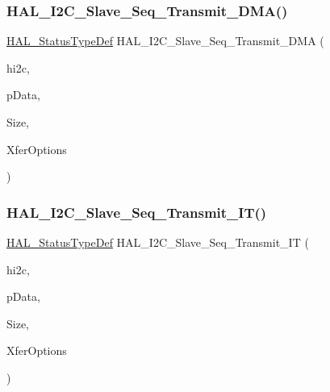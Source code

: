 \subsubsection{\texorpdfstring{H\+A\+L\+\_\+\+I2\+C\+\_\+\+Slave\+\_\+\+Seq\+\_\+\+Transmit\+\_\+\+D\+M\+A()}{HAL\_I2C\_Slave\_Seq\_Transmit\_DMA()}}
{\footnotesize\ttfamily \hyperlink{stm32f4xx__hal__def_8h_a63c0679d1cb8b8c684fbb0632743478f}{H\+A\+L\+\_\+\+Status\+Type\+Def} H\+A\+L\+\_\+\+I2\+C\+\_\+\+Slave\+\_\+\+Seq\+\_\+\+Transmit\+\_\+\+D\+MA (\begin{DoxyParamCaption}\item[{\hyperlink{group___i2_c__handle___structure__definition_ga68e9f45c2fd2161fb827ccdeabb55ea5}{I2\+C\+\_\+\+Handle\+Type\+Def} $\ast$}]{hi2c,  }\item[{uint8\+\_\+t $\ast$}]{p\+Data,  }\item[{uint16\+\_\+t}]{Size,  }\item[{uint32\+\_\+t}]{Xfer\+Options }\end{DoxyParamCaption})}

\mbox{\label{group___i2_c___exported___functions___group2_ga6d4024eb28117e0836c2477a855d7531}} 
\subsubsection{\texorpdfstring{H\+A\+L\+\_\+\+I2\+C\+\_\+\+Slave\+\_\+\+Seq\+\_\+\+Transmit\+\_\+\+I\+T()}{HAL\_I2C\_Slave\_Seq\_Transmit\_IT()}}
{\footnotesize\ttfamily \hyperlink{stm32f4xx__hal__def_8h_a63c0679d1cb8b8c684fbb0632743478f}{H\+A\+L\+\_\+\+Status\+Type\+Def} H\+A\+L\+\_\+\+I2\+C\+\_\+\+Slave\+\_\+\+Seq\+\_\+\+Transmit\+\_\+\+IT (\begin{DoxyParamCaption}\item[{\hyperlink{group___i2_c__handle___structure__definition_ga68e9f45c2fd2161fb827ccdeabb55ea5}{I2\+C\+\_\+\+Handle\+Type\+Def} $\ast$}]{hi2c,  }\item[{uint8\+\_\+t $\ast$}]{p\+Data,  }\item[{uint16\+\_\+t}]{Size,  }\item[{uint32\+\_\+t}]{Xfer\+Options }\end{DoxyParamCaption})}

